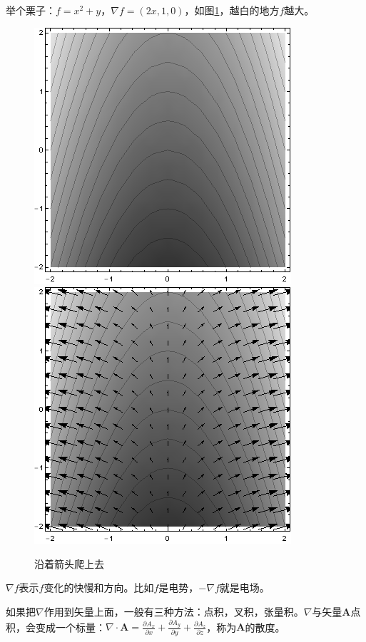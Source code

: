 举个栗子：$f=x^2+y$，$\nabla f=(2x,1,0)$，如图\ref{fig-vec-grad}，越白的地方$f$越大。
\begin{figure}[htb]
\centering
\includegraphics[scale=0.5]{fig/vec-grad.png}
\includegraphics[scale=0.5]{fig/vec-grad-2.png}
\caption{沿着箭头爬上去}
\label{fig-vec-grad}
\end{figure}

$\nabla f$表示$f$变化的快慢和方向。比如$f$是电势，$-\nabla f$就是电场。

如果把$\nabla$作用到矢量上面，一般有三种方法：点积，叉积，张量积。$\nabla$与矢量$\mathbf{A}$点积，会变成一个标量：$\nabla \cdot \mathbf{A}=\frac{\partial A_x}{\partial x}+\frac{\partial A_y}{\partial y}+\frac{\partial A_z}{\partial z}$，称为$\mathbf{A}$的散度。

